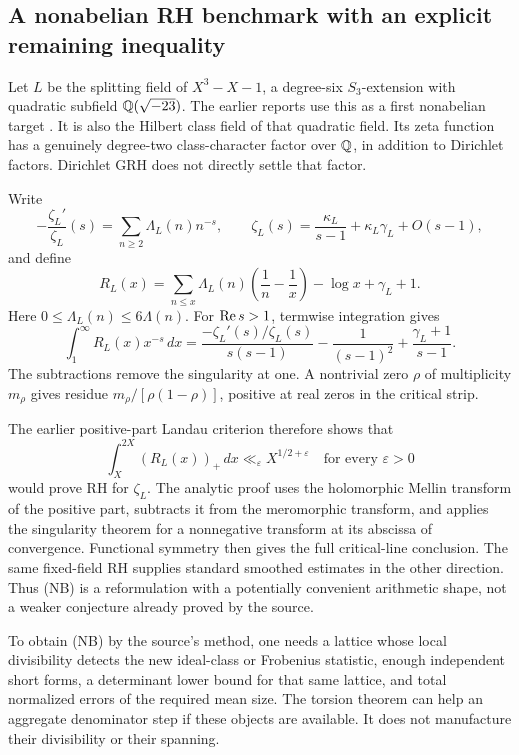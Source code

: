 \subsection{A nonabelian RH benchmark with an explicit remaining inequality}

Let \(L\) be the splitting field of \(X^3-X-1\), a degree-six
\(S_3\)-extension with quadratic subfield \(\mathbb Q(\sqrt{-23})\).
The earlier reports use this as a first nonabelian target
\cite{priormean,priorfoundations}. It is also the Hilbert class field
of that quadratic field. Its zeta function has a genuinely degree-two
class-character factor over \(\mathbb Q\), in addition to Dirichlet factors.
Dirichlet GRH does not directly settle that factor.

Write
\[
 -\frac{\zeta_L'}{\zeta_L}(s)=\sum_{n\ge2}\Lambda_L(n)n^{-s},
 \qquad
 \zeta_L(s)=\frac{\kappa_L}{s-1}
                +\kappa_L\gamma_L+O(s-1),
\]
and define
\[
 R_L(x)=\sum_{n\le x}\Lambda_L(n)\left(\frac1n-\frac1x\right)
              -\log x+\gamma_L+1.
\]
Here \(0\le\Lambda_L(n)\le6\Lambda(n)\).
For \(\operatorname{Re} s>1\), termwise integration gives
\[
 \int_1^\infty R_L(x)x^{-s}\,dx
 =\frac{-\zeta_L'(s)/\zeta_L(s)}{s(s-1)}
    -\frac1{(s-1)^2}+\frac{\gamma_L+1}{s-1}.
\]
The subtractions remove the singularity at one. A nontrivial zero
\(\rho\) of multiplicity \(m_\rho\) gives residue
\(m_\rho/[\rho(1-\rho)]\), positive at real zeros in the critical strip.

The earlier positive-part Landau criterion therefore shows that
\[
 \boxed{\qquad
 \int_X^{2X}(R_L(x))_+\,dx
        \ll_\varepsilon X^{1/2+\varepsilon}
 \quad\text{for every }\varepsilon>0
 \qquad}                                           \tag{NB}
\]
would prove RH for \(\zeta_L\). The analytic proof uses the holomorphic
Mellin transform of the positive part, subtracts it from the meromorphic
transform, and applies the singularity theorem for a nonnegative
transform at its abscissa of convergence. Functional symmetry then gives
the full critical-line conclusion. The same fixed-field RH supplies
standard smoothed estimates in the other direction. Thus (NB) is a
reformulation with a potentially convenient arithmetic shape, not a
weaker conjecture already proved by the source.

To obtain (NB) by the source's method, one needs a lattice whose local
divisibility detects the new ideal-class or Frobenius statistic, enough
independent short forms, a determinant lower bound for that same
lattice, and total normalized errors of the required mean size.
The torsion theorem can help an aggregate denominator step if these
objects are available. It does not manufacture their divisibility or
their spanning.

